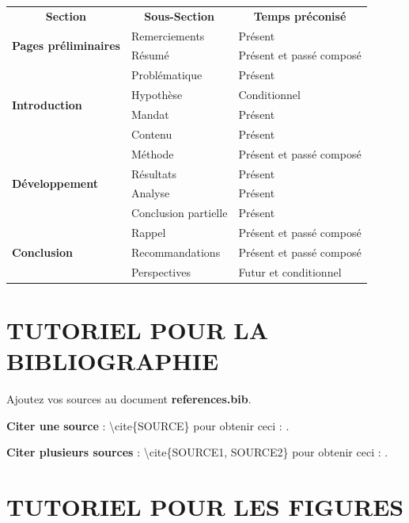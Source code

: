 \documentclass[12pt]{article} 	%
\begin{document}
{\begin{table}[!h]
\begin{tabular}{ @{}lll}
 \multicolumn{1}{c}{\bfseries{Section}} &  \multicolumn{1}{c}{\bfseries{Sous-Section}} & \multicolumn{1}{c}{\bfseries{Temps préconisé}} \\
 \cmidrule{1-3} 
\multirow{2}{*}{\bfseries{Pages préliminaires}} & \multicolumn{1}{|l|}{Remerciements}  & Présent \\
 & \multicolumn{1}{|l|}{Résumé}   & Présent et passé composé \\
  \cmidrule{1-3} 
 \multirow{4}{*}{\bfseries{Introduction}} & \multicolumn{1}{|l|}{Problématique}  & Présent \\
 & \multicolumn{1}{|l|}{Hypothèse}   & Conditionnel\\
 & \multicolumn{1}{|l|}{Mandat}   & Présent\\
 & \multicolumn{1}{|l|}{Contenu}   & Présent\\
   \cmidrule{1-3} 
 \multirow{4}{*}{\bfseries{Développement}} & \multicolumn{1}{|l|}{Méthode}  & Présent et passé composé\\
 & \multicolumn{1}{|l|}{Résultats}   & Présent\\
 & \multicolumn{1}{|l|}{Analyse}   & Présent\\
 & \multicolumn{1}{|l|}{Conclusion partielle}   & Présent\\
    \cmidrule{1-3} 
  \multirow{3}{*}{\bfseries{Conclusion}} & \multicolumn{1}{|l|}{Rappel}  & Présent et passé composé\\
 & \multicolumn{1}{|l|}{Recommandations}   & Présent et passé composé\\
 & \multicolumn{1}{|l|}{Perspectives}   & Futur et conditionnel\\

\bottomrule

\end{tabular}
\hspace*{\fill}
\end{table}

\section{TUTORIEL POUR LA BIBLIOGRAPHIE}
Ajoutez vos sources au document \textbf{references.bib}.

\textbf{Citer une source} : \textbackslash cite\{SOURCE\} pour obtenir ceci :
\cite{howard2020deep}.

\textbf{Citer plusieurs sources} : \textbackslash cite\{SOURCE1, SOURCE2\} pour
obtenir ceci : \cite{goodfellow2014generative, CycleGAN2017}.
\section{TUTORIEL POUR LES FIGURES}

}
\end{document}
